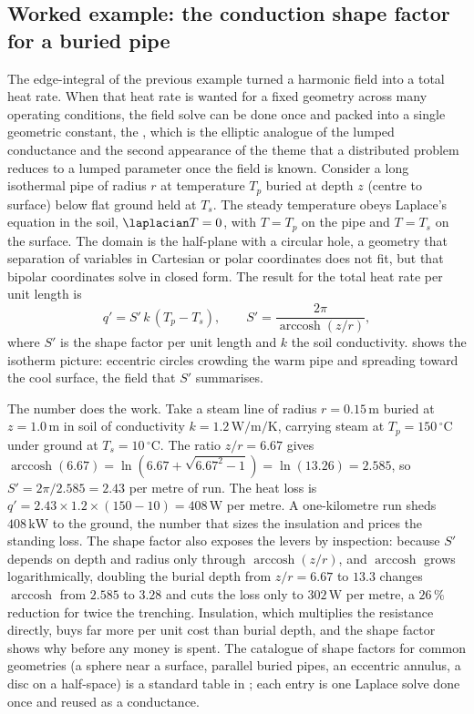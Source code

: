 \subsection{Worked example: the conduction shape factor for a buried pipe}

The edge-integral of the previous example turned a harmonic field
into a total heat rate. When that heat rate is wanted for a fixed
geometry across many operating conditions, the field solve can be
done once and packed into a single geometric constant, the
, which is the elliptic analogue of
the lumped conductance and the second appearance of the theme that a
distributed problem reduces to a lumped parameter once the field is
known. Consider a long isothermal pipe of radius $r$ at temperature
$T_{p}$ buried at depth $z$ (centre to surface) below flat ground held
at $T_{s}$. The steady temperature obeys Laplace's equation in the
soil, $\laplacian T = 0$, with $T = T_{p}$ on the pipe and $T = T_{s}$
on the surface. The domain is the half-plane with a circular hole, a
geometry that separation of variables in Cartesian or polar
coordinates does not fit, but that bipolar coordinates solve in closed
form. The result for the total heat rate per unit length is
\[
q' = S'\, k\,(T_{p} - T_{s}), \qquad
S' = \frac{2\pi}{\operatorname{arccosh}(z/r)},
\]
where $S'$ is the shape factor per unit length and $k$ the soil
conductivity.  shows the isotherm
picture: eccentric circles crowding the warm pipe and spreading toward
the cool surface, the field that $S'$ summarises.



The number does the work. Take a steam line of radius $r =
0.15\,\si{\meter}$ buried at $z = 1.0\,\si{\meter}$ in soil of
conductivity $k = 1.2\,\si{\watt\per\meter\per\kelvin}$, carrying
steam at $T_{p} = 150\,{}^{\circ}\mathrm{C}$ under ground at $T_{s} =
10\,{}^{\circ}\mathrm{C}$. The ratio $z/r = 6.67$ gives
$\operatorname{arccosh}(6.67) = \ln(6.67 + \sqrt{6.67^{2} - 1}) =
\ln(13.26) = 2.585$, so $S' = 2\pi/2.585 = 2.43$ per metre of run. The
heat loss is $q' = 2.43 \times 1.2 \times (150 - 10) = 408\,\si{\watt}$
per metre. A one-kilometre run sheds $408\,\si{\kilo\watt}$ to the
ground, the number that sizes the insulation and prices the standing
loss. The shape factor also exposes the levers by inspection: because
$S'$ depends on depth and radius only through $\operatorname{arccosh}
(z/r)$, and $\operatorname{arccosh}$ grows logarithmically, doubling
the burial depth from $z/r = 6.67$ to $13.3$ changes
$\operatorname{arccosh}$ from $2.585$ to $3.28$ and cuts the loss only
to $302\,\si{\watt}$ per metre, a $26\,\%$ reduction for twice the
trenching. Insulation, which multiplies the resistance directly, buys
far more per unit cost than burial depth, and the shape factor shows
why before any money is spent. The catalogue of shape factors for
common geometries (a sphere near a surface, parallel buried pipes, an
eccentric annulus, a disc on a half-space) is a standard table in
\textcite{text:incropera2007}; each entry is one Laplace solve done
once and reused as a conductance.


